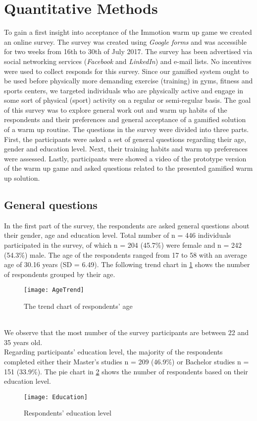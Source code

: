 \section{Quantitative Methods}
To gain a first insight into acceptance of the Immotion warm up game we created an online survey. The survey was created using \textit{Google forms} and was accessible for two weeks from 16th to 30th of July 2017. The survey has been advertised via social networking services (\textit{Facebook} and \textit{LinkedIn}) and e-mail lists. No incentives were used to collect responds for this survey. Since our gamified system ought to be used before physically more demanding exercise (training) in gyms, fitness and sports centers, we targeted individuals who are physically active and engage in some sort of physical (sport) activity on a regular or semi-regular basis. The goal of this survey was to explore general work out and warm up habits of the respondents and their preferences and general acceptance of a gamified solution of a warm up routine. The questions in the survey were divided into three parts. First, the participants were asked a set of general questions regarding their age, gender and education level. Next, their training habits and warm up preferences were assessed. Lastly, participants were showed a video of the prototype version of the warm up game and asked questions related to the presented gamified warm up solution. 

\subsection{General questions}
In the first part of the survey, the respondents are asked general questions about their gender, age and education level. Total number of n = 446 individuals participated in the survey, of which n = 204 (45.7\%) were female and n = 242 (54.3\%) male. The age of the respondents ranged from 17 to 58 with an average age of 30.16 years (SD = 6.49). The  following trend chart in \ref{fig:AgeTrend} shows the number of respondents grouped by their age.\\
\begin{figure}[h]
    \centering
    \texttt{[image: AgeTrend]}
    \caption{The trend chart of respondents' age}
    \label{fig:AgeTrend}
\end{figure}\\
We observe that the most number of the survey participants are between 22 and 35 years old.\\
Regarding participants' education level, the majority of the respondents completed either their Master's studies n = 209 (46.9\%) or Bachelor studies n = 151 (33.9\%). The pie chart in \ref{fig:Education} shows the number of respondents based on their education level. 
\begin{figure}[h]
    \centering
    \texttt{[image: Education]}
    \caption{Respondents' education level}
    \label{fig:Education}
\end{figure}
